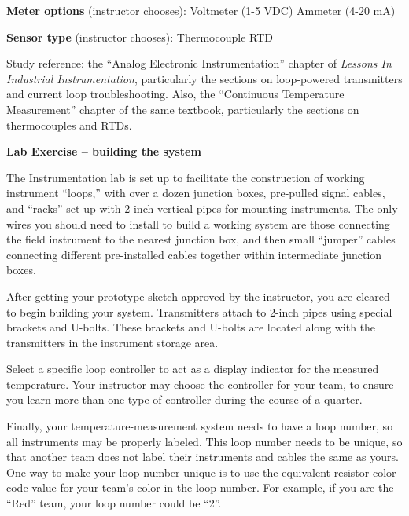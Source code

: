 \begin{itemize}
\vskip 10pt

\noindent
{\bf Meter options} (instructor chooses): \hskip 20pt \underbar{\hskip 20pt} Voltmeter (1-5 VDC) \hskip 20pt \underbar{\hskip 20pt} Ammeter (4-20 mA)

\vskip 10pt

\noindent
{\bf Sensor type} (instructor chooses): \hskip 20pt \underbar{\hskip 20pt} Thermocouple \hskip 20pt \underbar{\hskip 20pt} RTD

\vfil

Study reference: the ``Analog Electronic Instrumentation'' chapter of {\it Lessons In Industrial Instrumentation}, particularly the sections on loop-powered transmitters and current loop troubleshooting.  Also, the ``Continuous Temperature Measurement'' chapter of the same textbook, particularly the sections on thermocouples and RTDs.



\vfil \eject

\noindent
{\bf Lab Exercise -- building the system}

\vskip 5pt

The Instrumentation lab is set up to facilitate the construction of working instrument ``loops,'' with over a dozen junction boxes, pre-pulled signal cables, and ``racks'' set up with 2-inch vertical pipes for mounting instruments.  The only wires you should need to install to build a working system are those connecting the field instrument to the nearest junction box, and then small ``jumper'' cables connecting different pre-installed cables together within intermediate junction boxes.

After getting your prototype sketch approved by the instructor, you are cleared to begin building your system.  Transmitters attach to 2-inch pipes using special brackets and U-bolts.  These brackets and U-bolts are located along with the transmitters in the instrument storage area.  

Select a specific loop controller to act as a display indicator for the measured temperature.  Your instructor may choose the controller for your team, to ensure you learn more than one type of controller during the course of a quarter.

Finally, your temperature-measurement system needs to have a loop number, so all instruments may be properly labeled.  This loop number needs to be unique, so that another team does not label their instruments and cables the same as yours.  One way to make your loop number unique is to use the equivalent resistor color-code value for your team's color in the loop number.  For example, if you are the ``Red'' team, your loop number could be ``2''. 


\end{itemize}
